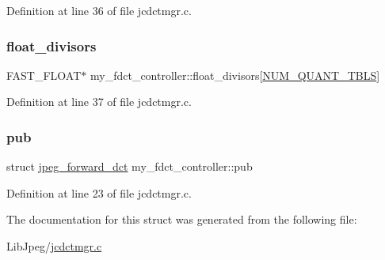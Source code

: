 Definition at line 36 of file jcdctmgr.\+c.

\mbox{\label{structmy__fdct__controller_a3de557b163ea4ed33523ef4fc13dc962}} 
\subsubsection{\texorpdfstring{float\_divisors}{float\_divisors}}
{\footnotesize\ttfamily F\+A\+S\+T\+\_\+\+F\+L\+O\+AT$\ast$ my\+\_\+fdct\+\_\+controller\+::float\+\_\+divisors\mbox{[}\mbox{\hyperlink{jpeglib_8h_ab3254a23612ea48615001fffc0c9f691}{N\+U\+M\+\_\+\+Q\+U\+A\+N\+T\+\_\+\+T\+B\+LS}}\mbox{]}}



Definition at line 37 of file jcdctmgr.\+c.

\mbox{\label{structmy__fdct__controller_a233a1343c6fc838dcad3d3dce3a658a0}} 
\subsubsection{\texorpdfstring{pub}{pub}}
{\footnotesize\ttfamily struct \mbox{\hyperlink{structjpeg__forward__dct}{jpeg\+\_\+forward\+\_\+dct}} my\+\_\+fdct\+\_\+controller\+::pub}



Definition at line 23 of file jcdctmgr.\+c.



The documentation for this struct was generated from the following file\+:\begin{DoxyCompactItemize}
\item 
Lib\+Jpeg/\mbox{\hyperlink{jcdctmgr_8c}{jcdctmgr.\+c}}\end{DoxyCompactItemize}
